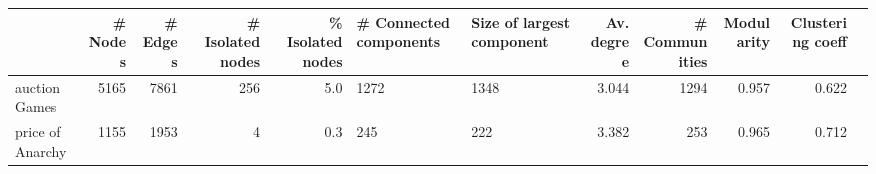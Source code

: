 \begin{tabular}{lrrrrP{0.2\textwidth}P{0.2\textwidth}rrrrr}
\toprule
{} &  \# Nodes &  \# Edges &  \# Isolated nodes &  \% Isolated nodes &  \# Connected components &  Size of largest component &  Av. degree &  \# Communities &  Modularity &  Clustering coeff \\
\midrule
auction Games    &     5165 &     7861 &               256 &               5.0 &                    1272 &                       1348 &       3.044 &           1294 &       0.957 &             0.622 \\
price of Anarchy &     1155 &     1953 &                 4 &               0.3 &                     245 &                        222 &       3.382 &            253 &       0.965 &             0.712 \\
\bottomrule
\end{tabular}
